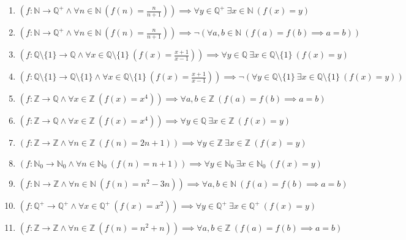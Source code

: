 \documentclass[11pt,a4paper]{article}
\begin{document}
\begin{enumerate}
\item $\displaystyle (f \colon \mathbb{N} \to \mathbb{Q}^{+} \land \forall n \in \mathbb{N}\ (f(n) = \frac{n}{n + 1})) \implies \forall y \in \mathbb{Q}^{+}\ \exists x \in \mathbb{N}\ (f(x) = y)$
\item $\displaystyle (f \colon \mathbb{N} \to \mathbb{Q}^{+} \land \forall n \in \mathbb{N}\ (f(n) = \frac{n}{n + 1})) \implies \lnot (\forall a, b \in \mathbb{N}\ (f(a) = f(b) \implies a = b))$
\item $\displaystyle (f \colon \mathbb{Q} \setminus \{1\} \to \mathbb{Q} \land \forall x \in \mathbb{Q} \setminus \{1\}\ (f(x) = \frac{x + 1}{x - 1})) \implies \forall y \in \mathbb{Q}\ \exists x \in \mathbb{Q} \setminus \{1\}\ (f(x) = y)$
\item $\displaystyle (f \colon \mathbb{Q} \setminus \{1\} \to \mathbb{Q} \setminus \{1\} \land \forall x \in \mathbb{Q} \setminus \{1\}\ (f(x) = \frac{x + 1}{x - 1})) \implies \lnot (\forall y \in \mathbb{Q} \setminus \{1\}\ \exists x \in \mathbb{Q} \setminus \{1\}\ (f(x) = y))$
\item $\displaystyle (f \colon \mathbb{Z} \to \mathbb{Q} \land \forall x \in \mathbb{Z}\ (f(x) = x^{4})) \implies \forall a, b \in \mathbb{Z}\ (f(a) = f(b) \implies a = b)$
\item $\displaystyle (f \colon \mathbb{Z} \to \mathbb{Q} \land \forall x \in \mathbb{Z}\ (f(x) = x^{4})) \implies \forall y \in \mathbb{Q}\ \exists x \in \mathbb{Z}\ (f(x) = y)$
\item $\displaystyle (f \colon \mathbb{Z} \to \mathbb{Z} \land \forall n \in \mathbb{Z}\ (f(n) = 2n + 1)) \implies \forall y \in \mathbb{Z}\ \exists x \in \mathbb{Z}\ (f(x) = y)$
\item $\displaystyle (f \colon \mathbb{N}_{0} \to \mathbb{N}_{0} \land \forall n \in \mathbb{N}_{0}\ (f(n) = n + 1)) \implies \forall y \in \mathbb{N}_{0}\ \exists x \in \mathbb{N}_{0}\ (f(x) = y)$
\item $\displaystyle (f \colon \mathbb{N} \to \mathbb{Z} \land \forall n \in \mathbb{N}\ (f(n) = n^{2} - 3n)) \implies \forall a, b \in \mathbb{N}\ (f(a) = f(b) \implies a = b)$
\item $\displaystyle (f \colon \mathbb{Q}^{+} \to \mathbb{Q}^{+} \land \forall x \in \mathbb{Q}^{+}\ (f(x) = x^{2})) \implies \forall y \in \mathbb{Q}^{+}\ \exists x \in \mathbb{Q}^{+}\ (f(x) = y)$
\item $\displaystyle (f \colon \mathbb{Z} \to \mathbb{Z} \land \forall n \in \mathbb{Z}\ (f(n) = n^{2} + n)) \implies \forall a, b \in \mathbb{Z}\ (f(a) = f(b) \implies a = b)$

\end{enumerate}
\end{document}
